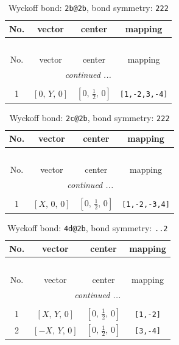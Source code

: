 \documentclass[fleqn,8pt]{jsarticle}
\begin{document}
\begin{longtable}{cccc}
\caption{Wyckoff bond: {\tt 2b@2b}, bond symmetry: {\tt 222}}
 \\
 \hline \hline
No. & vector & center & mapping \\ \hline \endfirsthead

\multicolumn{3}{l}{\tablename\ \thetable{}} \\
 \hline \hline
No. & vector & center & mapping \\ \hline \endhead

 \hline \hline
\multicolumn{3}{r}{\footnotesize\it continued ...} \\ \endfoot

 \hline \hline
\multicolumn{3}{r}{} \\ \endlastfoot

1 & $\left[ 0,\, Y,\, 0 \right]$ & $\left[ 0,\, \frac{1}{2},\, 0 \right]$ & {\tt [1,-2,3,-4]} \\
\end{longtable}
\renewcommand{\arraystretch}{1.2}
\begin{longtable}{cccc}
\caption{Wyckoff bond: {\tt 2c@2b}, bond symmetry: {\tt 222}}
 \\
 \hline \hline
No. & vector & center & mapping \\ \hline \endfirsthead

\multicolumn{3}{l}{\tablename\ \thetable{}} \\
 \hline \hline
No. & vector & center & mapping \\ \hline \endhead

 \hline \hline
\multicolumn{3}{r}{\footnotesize\it continued ...} \\ \endfoot

 \hline \hline
\multicolumn{3}{r}{} \\ \endlastfoot

1 & $\left[ X,\, 0,\, 0 \right]$ & $\left[ 0,\, \frac{1}{2},\, 0 \right]$ & {\tt [1,-2,-3,4]} \\
\end{longtable}
\renewcommand{\arraystretch}{1.2}
\begin{longtable}{cccc}
\caption{Wyckoff bond: {\tt 4d@2b}, bond symmetry: {\tt ..2}}
 \\
 \hline \hline
No. & vector & center & mapping \\ \hline \endfirsthead

\multicolumn{3}{l}{\tablename\ \thetable{}} \\
 \hline \hline
No. & vector & center & mapping \\ \hline \endhead

 \hline \hline
\multicolumn{3}{r}{\footnotesize\it continued ...} \\ \endfoot

 \hline \hline
\multicolumn{3}{r}{} \\ \endlastfoot

1 & $\left[ X,\, Y,\, 0 \right]$ & $\left[ 0,\, \frac{1}{2},\, 0 \right]$ & {\tt [1,-2]} \\ \hline
2 & $\left[ - X,\, Y,\, 0 \right]$ & $\left[ 0,\, \frac{1}{2},\, 0 \right]$ & {\tt [3,-4]} \\
\end{longtable}
\end{document}
